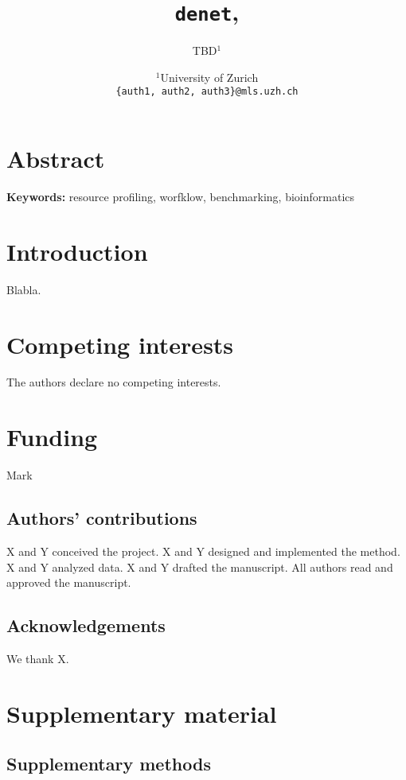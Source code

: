 \documentclass[10pt]{article}
\title{\texttt{denet},}
\author{TBD$^1$}
\date{
	$^1$University of Zurich \\ \texttt{\{auth1, auth2, auth3\}@mls.uzh.ch}\\%
}
\renewcommand{\label}[1]{\gdef\labelname{##1}}%
\newcommand{\beginsupplement}{%
        \setcounter{table}{0}
        \renewcommand{\thetable}{S\arabic{table}}%
        \setcounter{figure}{0}
        \renewcommand{\thefigure}{S\arabic{figure}}%
        \setcounter{section}{0}
        \renewcommand{\thesection}{S\arabic{section}}%
      }
\begin{document}
\maketitle
	
\section{Abstract} %


\vspace{1cm}

\noindent\textbf{Keywords:} resource profiling, worfklow, benchmarking, bioinformatics

\clearpage


\section{Introduction}  %
\label{sec:intro}

Blabla.


\section{Competing interests}
The authors declare no competing interests.

\section{Funding}

{\color{red} Mark}

\subsection{Authors' contributions}

X and Y conceived the project. X and Y designed and implemented the method. X and Y analyzed data. X and Y drafted the manuscript. All authors read and approved the manuscript.

\subsection{Acknowledgements}

We thank {\color{red}X}.




\clearpage

\beginsupplement
\section{Supplementary material}  %

\subsection{Supplementary methods}  %
\end{document}
